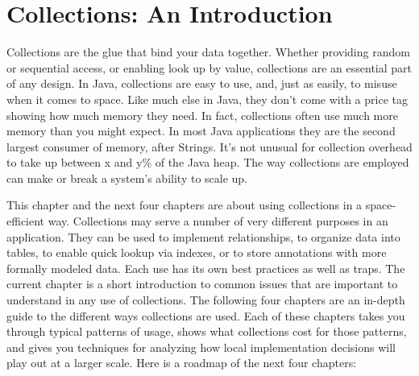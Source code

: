 \chapter{Collections: An Introduction}
\label{chapter:brief-introduction-collections}

Collections are the glue that bind your data together.  Whether 
providing random or sequential access, or enabling
look up by value, collections are an essential part of any
design. In Java, collections are easy to use, and, just as easily, to misuse when
it comes to space. Like much else in Java, they don't come with a price tag
showing how much memory they need. In fact, collections
often use much more memory than you might expect. In most Java applications they are the second largest consumer of memory, after
Strings. It's not unusual for collection overhead to take up between x and y\%
of the Java heap. The way collections are employed can make
or break a system's ability to scale up.


This chapter and the next four chapters are about using
collections in a space-efficient way.  Collections may serve a number of very
different purposes in an application. They can be used to implement
relationships, to organize data into tables, to enable quick lookup via indexes, or
to store annotations with more formally modeled data. Each use
has its own best practices as well as traps. The current chapter
is a short introduction to common issues that are important to understand in
any use of collections. The following four chapters are an in-depth guide to 
the different ways collections are used. Each of these chapters takes
you through typical patterns of usage, shows what collections cost for those
patterns, and gives you techniques for analyzing how local implementation
decisions will play out at a larger scale. Here is a roadmap of the next four chapters:

%

